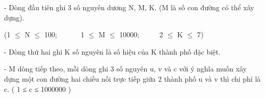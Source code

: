 - Dòng đầu tiên ghi 3 số nguyên dương N, M, K. (M là số con đường có thể xây dựng).

(1  $\le$  N  $\le$  100;       1  $\le$  M  $\le$  10000;      2  $\le$  K  $\le$  7)

- Dòng thứ hai ghi K số nguyên là số hiệu của K thành phố đặc biệt.

- M dòng tiếp theo, mỗi dòng ghi 3 số nguyên u, v và c với ý nghĩa muốn xây dựng một con đường hai chiều nối trực tiếp giữa 2 thành phố u và v thì chi phí là c. ( 1 ≤ c ≤ 1000000 )

 

\